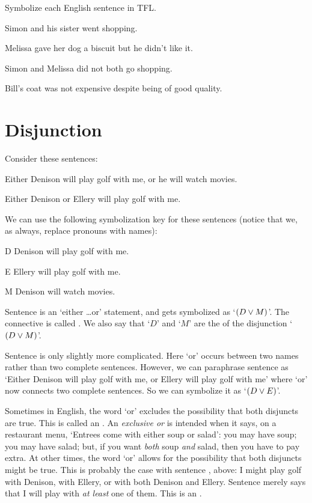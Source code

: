 \practiceproblems
\problempart Symbolize each English sentence in TFL.

\begin{earg}
\item Simon and his sister went shopping.
\item Melissa gave her dog a biscuit but he didn't like it.
\item Simon and Melissa did not both go shopping.
\item Bill's coat was not expensive despite being of good quality.
\end{earg}

\section{Disjunction}\label{s:Disjunction}
Consider these sentences:
	\begin{earg}
		\item[\ex{or1}]Either Denison will play golf with me, or he will watch movies.
		\item[\ex{or2}]Either Denison or Ellery will play golf with me.
	\end{earg}
We can use the following symbolization key for these sentences (notice that we, as always, replace pronouns with names):
	\begin{ekey}
		\item[D] Denison will play golf with me.
		\item[E] Ellery will play golf with me.
		\item[M] Denison will watch movies.
	\end{ekey}
Sentence  is an `either \ldots or' statement, and gets symbolized as `$(D \vee M)$'. The connective is called . We also say that `$D$' and `$M$' are the  of the disjunction `$(D \vee M)$'.

Sentence  is only slightly more complicated.  Here `or' occurs between two names rather than two complete sentences. However, we can paraphrase sentence  as `Either Denison will play golf with me, or Ellery will play golf with me' where `or' now connects two complete sentences. So we can symbolize it as `$(D \vee E)$'.


Sometimes in English, the word `or' excludes the possibility that both disjuncts are true. This is called an .  An \emph{exclusive or} is  intended when it says, on a restaurant menu, `Entrees come with either soup or salad': you may have soup; you may have salad; but, if you want \emph{both} soup \emph{and} salad, then you have to pay extra.  At other times, the word `or' allows for the possibility that both disjuncts might be true. This is probably the case with sentence , above: I might play golf with Denison, with Ellery, or with both Denison and Ellery. Sentence  merely says that I will play with \emph{at least} one of them. This is an .

